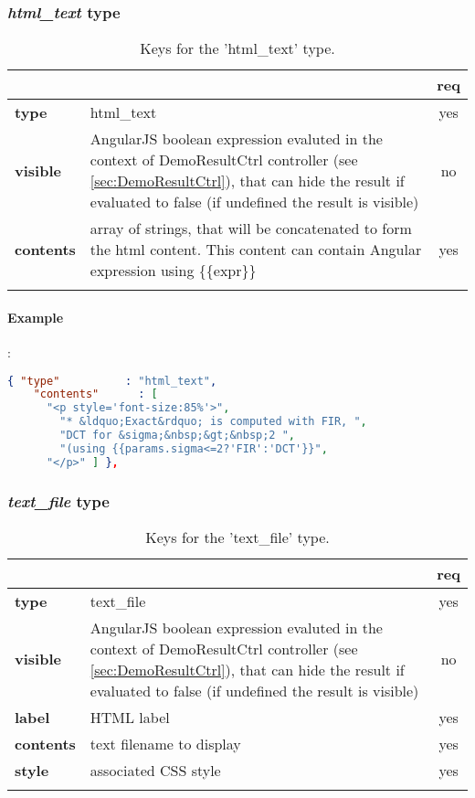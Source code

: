 \subsubsection{ \emph{html\_text} type}

\begin{longtable}{|>{\bf}L{\linewidth}|L{\linewidth}|c|}
\hline
{}     &  & {\bf req} \tabularnewline 
\hline \hline
 type      & html\_text  & yes \\ \hline
 visible   & AngularJS boolean expression evaluted in the context of DemoResultCtrl
             controller (see \ref{sec:DemoResultCtrl}), that can hide the result if
             evaluated to false (if undefined the result is visible)& no \\ \hline
 contents  & array of strings, that will be concatenated to form the html 
             content. This content can contain Angular expression using \{\{expr\}\}& yes \\ \hline
\caption{Keys for the 'html\_text' type.}
\end{longtable}

\paragraph{Example}:\\
\begin{lstlisting}[language=json,firstnumber=1]
  { "type"          : "html_text", 
    "contents"      : [
      "<p style='font-size:85%'>",
        "* &ldquo;Exact&rdquo; is computed with FIR, ",
        "DCT for &sigma;&nbsp;&gt;&nbsp;2 ",
        "(using {{params.sigma<=2?'FIR':'DCT'}}",
      "</p>" ] },
\end{lstlisting}


\subsubsection{ \emph{text\_file} type}

\begin{longtable}{|>{\bf}L{\linewidth}|L{\linewidth}|c|}
\hline
{}     &  & {\bf req} \tabularnewline 
\hline \hline
 type      & text\_file  & yes \\ \hline
 visible   & AngularJS boolean expression evaluted in the context of DemoResultCtrl
             controller (see \ref{sec:DemoResultCtrl}), that can hide the result if
             evaluated to false (if undefined the result is visible)& no \\ \hline
 label     & HTML label & yes \\ \hline
 contents  & text filename to display & yes \\ \hline
 style     & associated CSS style & yes \\ \hline
\caption{Keys for the 'text\_file' type.}
\end{longtable}

